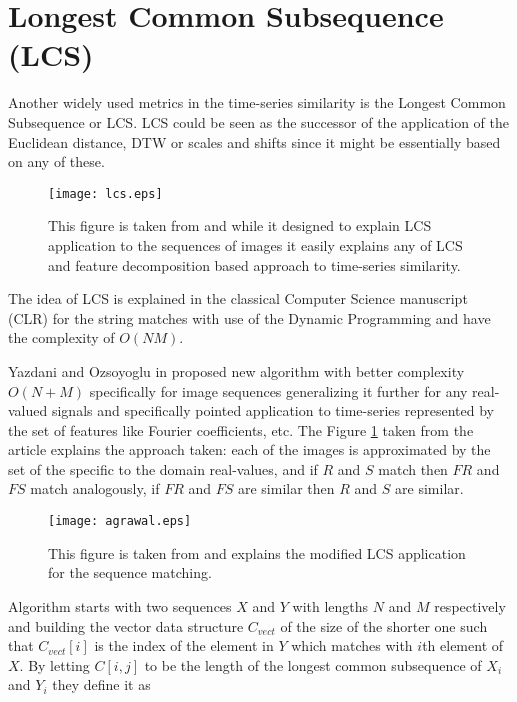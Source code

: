 \section{Longest Common Subsequence (LCS) } \label{lcs}
Another widely used metrics in the time-series similarity is the Longest Common Subsequence or LCS. LCS could be seen as the successor of the application of the Euclidean distance, DTW or scales and shifts \cite{citeulike:3816327} since it might be essentially based on any of these. 
\begin{figure}[tbp]
   \centering
   \texttt{[image: lcs.eps]}
   \caption{This figure is taken from \cite{citeulike:4367061} and while it designed to explain LCS application to the sequences of images it easily explains any of LCS and feature decomposition based approach to time-series similarity.}
   \label{fig:lcs}
\end{figure} 
The idea of LCS is explained in the classical Computer Science manuscript \cite{citeulike:180287} (CLR) for the string matches with use of the Dynamic Programming and have the complexity of $O(NM)$. 

Yazdani and Ozsoyoglu in \cite{citeulike:4367061} proposed new algorithm with better complexity $O(N+M)$ specifically for image sequences generalizing it further for any real-valued signals and specifically pointed application to time-series represented by the set of features like Fourier coefficients, etc. The Figure \ref{fig:lcs} taken from the article explains the approach taken: each of the images is approximated by the set of the specific to the domain real-values, and if $R$ and $S$ match then $FR$ and $FS$ match analogously, if $FR$ and $FS$ are similar then $R$ and $S$ are similar.

\begin{figure}[bp]
   \centering
   \texttt{[image: agrawal.eps]}
   \caption{This figure is taken from \cite{citeulike:3816327} and explains the modified LCS application for the sequence matching.}
   \label{fig:agrawal_lcs}
\end{figure} 

Algorithm starts with two sequences $X$ and $Y$ with lengths $N$ and $M$ respectively and building the vector data structure $C_{vect}$ of the size of the shorter one such that $C_{vect}[i]$ is the index of the element in $Y$ which matches with $i$th element of $X$. By letting $C[i,j]$ to be the length of the longest common subsequence of $X_{i}$ and $Y_{i}$ they define it as 

